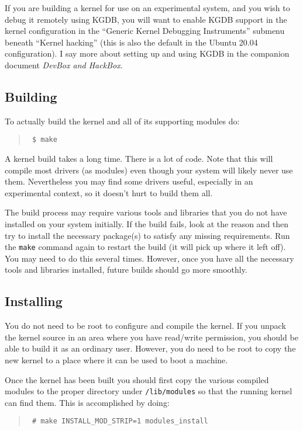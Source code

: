 \documentclass{article}
\newcommand{\command}[1]{\texttt{#1}}
\newcommand{\filename}[1]{\texttt{#1}}
\newenvironment{commands}
  {\begin{quote} \tt}
  {\end{quote}}
\begin{document}
If you are building a kernel for use on an experimental system, and you wish to debug it
remotely using KGDB, you will want to enable KGDB support in the kernel configuration in the
``Generic Kernel Debugging Instruments'' submenu beneath ``Kernel hacking'' (this is also the
default in the Ubuntu 20.04 configuration). I say more about setting up and using KGDB in the
companion document \textit{DevBox and HackBox}.

\subsection{Building}
\label{sec:building}

To actually build the kernel and all of its supporting modules do:
\begin{commands}
  \$ make
\end{commands}

A kernel build takes a long time. There is a lot of code. Note that this will compile most
drivers (as modules) even though your system will likely never use them. Nevertheless you may
find some drivers useful, especially in an experimental context, so it doesn't hurt to build
them all.

The build process may require various tools and libraries that you do not have installed on your
system initially. If the build fails, look at the reason and then try to install the necessary
package(s) to satisfy any missing requirements. Run the \command{make} command again to restart
the build (it will pick up where it left off). You may need to do this several times. However,
once you have all the necessary tools and libraries installed, future builds should go more
smoothly.

\subsection{Installing}

You do not need to be root to configure and compile the kernel. If you unpack the kernel source
in an area where you have read/write permission, you should be able to build it as an ordinary
user. However, you do need to be root to copy the new kernel to a place where it can be used to
boot a machine.

Once the kernel has been built you should first copy the various compiled modules to the proper
directory under \filename{/lib/modules} so that the running kernel can find them. This is
accomplished by doing:
\begin{commands}
  \# make INSTALL\_MOD\_STRIP=1 modules\_install
\end{commands}
\end{document}
